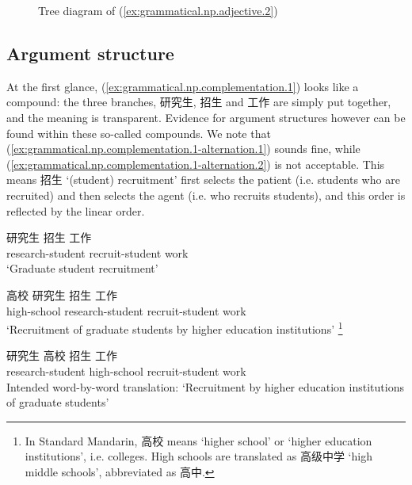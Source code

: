 \documentclass[UTF8, a4paper, oneside, scheme=plain, 12pt]{ctexrep}
\newcommand{\translate}[1]{`#1'}
\begin{document}
\begin{figure}[H]
    \centering
    {
        \centering
        
    }
    \caption{Tree diagram of (\ref{ex:grammatical.np.adjective.2})}
    \label{fig:grammatical.np.adjective.2}
\end{figure}

\subsection{Argument structure}\label{sec:grammatical.np.complementation}

At the first glance, (\ref{ex:grammatical.np.complementation.1}) looks like a compound:
the three branches, 研究生, 招生 and 工作 are simply put together,
and the meaning is transparent.
Evidence for argument structures however can be found within these so-called compounds.
We note that (\ref{ex:grammatical.np.complementation.1-alternation.1}) sounds fine,
while (\ref{ex:grammatical.np.complementation.1-alternation.2}) is not acceptable.
This means 招生 \translate{(student) recruitment} first selects the patient
(i.e. students who are recruited)
and then selects the agent (i.e. who recruits students),
and this order is reflected by the linear order.

\begin{exe}
    \ex\label{ex:grammatical.np.complementation.1}
    \gll 研究生 招生 工作 \\
    research-student recruit-student work \\
    \glt\translate{Graduate student recruitment} 
    
    \ex\label{ex:grammatical.np.complementation.1-alternation} \begin{xlist}
        \ex \label{ex:grammatical.np.complementation.1-alternation.1}
        \gll 高校 研究生 招生 工作 \\
        high-school research-student recruit-student work \\
        \glt\translate{Recruitment of graduate students by higher education institutions}%
        \footnote{
            In Standard Mandarin, 高校 means \translate{higher school} 
            or \translate{higher education institutions}, i.e. colleges.
            High schools are translated as 高级中学 \translate{high middle schools},
            abbreviated as 高中.
        }

        \ex \label{ex:grammatical.np.complementation.1-alternation.2}
        \gll *研究生 高校 招生 工作 \\
        research-student high-school recruit-student work \\
        \glt Intended word-by-word translation: \translate{Recruitment by higher education institutions of graduate students}
    \end{xlist}
\end{exe}
\end{document}
